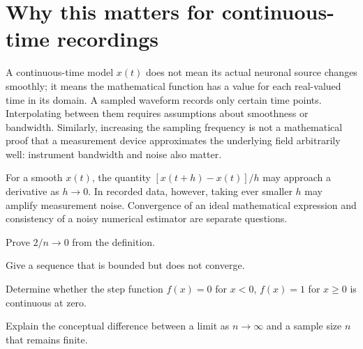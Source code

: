 \section{Why this matters for continuous-time recordings}
A continuous-time model $x(t)$ does not mean its actual neuronal source changes smoothly; it means the mathematical function has a value for each real-valued time in its domain. A sampled waveform records only certain time points. Interpolating between them requires assumptions about smoothness or bandwidth. Similarly, increasing the sampling frequency is not a mathematical proof that a measurement device approximates the underlying field arbitrarily well: instrument bandwidth and noise also matter.

\begin{workedexample}
For a smooth $x(t)$, the quantity $[x(t+h)-x(t)]/h$ may approach a derivative as $h\to0$. In recorded data, however, taking ever smaller $h$ may amplify measurement noise. Convergence of an ideal mathematical expression and consistency of a noisy numerical estimator are separate questions.
\end{workedexample}
\begin{exercises}
\item Prove $2/n\to0$ from the definition.
\item Give a sequence that is bounded but does not converge.
\item Determine whether the step function $f(x)=0$ for $x<0$, $f(x)=1$ for $x\ge0$ is continuous at zero.
\item Explain the conceptual difference between a limit as $n\to\infty$ and a sample size $n$ that remains finite.
\end{exercises}